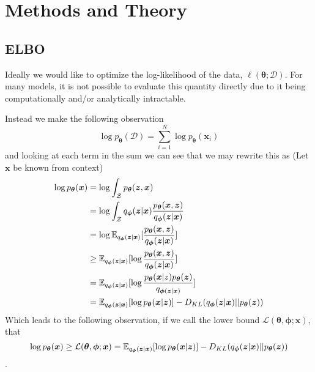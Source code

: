 \chapter{Methods and Theory}
\label{MethodsCh}

\section{ELBO}

Ideally we would like to optimize the log-likelihood of the data,
$\ell(\bm{\theta} ; \mathcal{D})$. For many models, it is not possible to
evaluate this quantity directly due to it being computationally and/or
analytically intractable.

Instead we make the following observation
\begin{equation}
  \label{eq:log_likelihood_sum}
  \log p_{\bm{\theta}}(\mathcal{D}) = \sum_{i=1}^N \log p_{\bm{\theta}}(\bm{x}_i)
\end{equation}
and looking at each term in the sum we can see that we may rewrite this as (Let
$\bm{x}$ be known from context)
\begin{align*}
  \log p_{\bm{\theta}}(\bm{x}) & = \log \int_{\mathcal{Z}} p_{\bm{\theta}}(\bm{z}, \bm{x})\\
                               & = \log \int_{\mathcal{Z}}q_{\bm{\phi}}(\bm{z} | \bm{x}) \frac{p_{\bm{\theta}}(\bm{x}, \bm{z})}{q_{\bm{\phi}}(\bm{z} | \bm{x})} \\
                               & = \log \operatorname{\mathbb{E}}_{q_{\bm{\phi}}(\bm{z} | \bm{x})}[\frac{p_{\bm{\theta}}(\bm{x}, \bm{z})}{q_{\bm{\phi}}(\bm{z} | \bm{x})}] \\
                               & \geq \operatorname{\mathbb{E}}_{q_{\bm{\phi}}(\bm{z} | \bm{x})}[\log \frac{p_{\bm{\theta}}(\bm{x}, \bm{z})}{q_{\bm{\phi}}(\bm{z} | \bm{x})}] \\
                               & = \operatorname{\mathbb{E}}_{q_{\bm{\phi}}(\bm{z} | \bm{x})}[\log \frac{p_{\bm{\theta}}(\bm{x} | z) p_{\bm{\theta}}(\bm{z})}{q_{\bm{\phi}(\bm{z} | \bm{x})}}] \\
                               & = \operatorname{\mathbb{E}}_{q_{\bm{\phi}}(\bm{z} | \bm{x})}[\log p_{\bm{\theta}}(\bm{x} | \bm{z})] - D_{KL}(q_{\bm{\phi}}(\bm{z} | \bm{x}) || p_{\bm{\theta}}(\bm{z}))
\end{align*}
Which leads to the following observation, if we call the lower bound
$\mathcal{L}(\bm{\theta}, \bm{\phi}; \bm{x})$, that
\begin{equation}
  \label{eq:ELBO_inequality}
  \log p_{\bm{\theta}}(\bm{x}) \geq \mathcal{L}(\bm{\theta}, \bm{\phi}; \bm{x}) = \operatorname{\mathbb{E}}_{q_{\bm{\phi}}(\bm{z} | \bm{x})}[\log p_{\bm{\theta}}(\bm{x} | \bm{z})] - D_{KL}(q_{\bm{\phi}}(\bm{z} | \bm{x}) || p_{\bm{\theta}}(\bm{z}))
\end{equation}.

